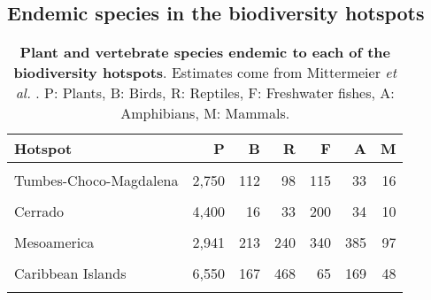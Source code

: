 \documentclass[
  12pt,
]{article}
\begin{document}
\hypertarget{endemic-species-in-the-biodiversity-hotspots}{%
\subsection{Endemic species in the biodiversity hotspots}\label{endemic-species-in-the-biodiversity-hotspots}}



\begin{table}[H]

\caption{\label{tab:hotspots}\textbf{Plant and vertebrate species endemic to each of the biodiversity hotspots}. Estimates come from Mittermeier \emph{et al.} \citep{Mittermeier2011}. P: Plants, B: Birds, R: Reptiles, F: Freshwater fishes, A: Amphibians, M: Mammals.\vspace{0.5cm}}
\centering
\fontsize{11}{13}\selectfont
\begin{tabular}[t]{lrrrrrr}
\toprule
Hotspot & P & B & R & F & A & M\\
\midrule
\cellcolor{gray!6}{Tropical Andes} & \cellcolor{gray!6}{15,000} & \cellcolor{gray!6}{584} & \cellcolor{gray!6}{275} & \cellcolor{gray!6}{131} & \cellcolor{gray!6}{763} & \cellcolor{gray!6}{117}\\
Tumbes-Choco-Magdalena & 2,750 & 112 & 98 & 115 & 33 & 16\\
\cellcolor{gray!6}{Atlantic Forest} & \cellcolor{gray!6}{8,000} & \cellcolor{gray!6}{148} & \cellcolor{gray!6}{94} & \cellcolor{gray!6}{133} & \cellcolor{gray!6}{323} & \cellcolor{gray!6}{48}\\
Cerrado & 4,400 & 16 & 33 & 200 & 34 & 10\\
\cellcolor{gray!6}{Chilean Winter Rainfall and Valdivian Forest} & \cellcolor{gray!6}{1,957} & \cellcolor{gray!6}{12} & \cellcolor{gray!6}{27} & \cellcolor{gray!6}{24} & \cellcolor{gray!6}{32} & \cellcolor{gray!6}{19}\\
Mesoamerica & 2,941 & 213 & 240 & 340 & 385 & 97\\
\cellcolor{gray!6}{Madrean Pine-Oak Woodlands} & \cellcolor{gray!6}{3,975} & \cellcolor{gray!6}{23} & \cellcolor{gray!6}{37} & \cellcolor{gray!6}{18} & \cellcolor{gray!6}{59} & \cellcolor{gray!6}{14}\\
Caribbean Islands & 6,550 & 167 & 468 & 65 & 169 & 48\\
\cellcolor{gray!6}{California Floristic Province} & \cellcolor{gray!6}{2,124} & \cellcolor{gray!6}{8} & \cellcolor{gray!6}{4} & \cellcolor{gray!6}{15} & \cellcolor{gray!6}{27} & \cellcolor{gray!6}{15}\\

\end{tabular}
\end{table}
\end{document}
